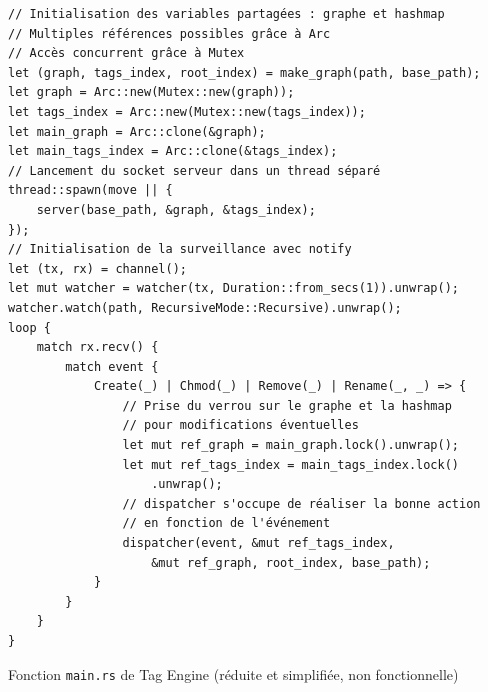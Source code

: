 \begin{code}
    \begin{verbatim}
// Initialisation des variables partagées : graphe et hashmap
// Multiples références possibles grâce à Arc 
// Accès concurrent grâce à Mutex
let (graph, tags_index, root_index) = make_graph(path, base_path);
let graph = Arc::new(Mutex::new(graph));
let tags_index = Arc::new(Mutex::new(tags_index));
let main_graph = Arc::clone(&graph);
let main_tags_index = Arc::clone(&tags_index);
// Lancement du socket serveur dans un thread séparé
thread::spawn(move || {
    server(base_path, &graph, &tags_index);
});
// Initialisation de la surveillance avec notify
let (tx, rx) = channel();
let mut watcher = watcher(tx, Duration::from_secs(1)).unwrap();
watcher.watch(path, RecursiveMode::Recursive).unwrap();
loop {
    match rx.recv() {
        match event {
            Create(_) | Chmod(_) | Remove(_) | Rename(_, _) => {
                // Prise du verrou sur le graphe et la hashmap 
                // pour modifications éventuelles
                let mut ref_graph = main_graph.lock().unwrap();
                let mut ref_tags_index = main_tags_index.lock()
                    .unwrap();
                // dispatcher s'occupe de réaliser la bonne action
                // en fonction de l'événement
                dispatcher(event, &mut ref_tags_index,
                    &mut ref_graph, root_index, base_path);
            }
        }
    }
}
    \end{verbatim}
    \caption{Fonction \texttt{main.rs} de Tag Engine (réduite et simplifiée, non fonctionnelle)}
    \label{tag_engine_notify_main}
\end{code}
\bigbreak

